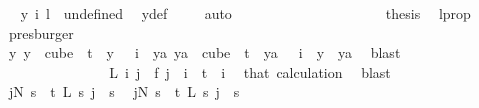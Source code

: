 \begin{isabellebody}
\ \isamarkupfalse%
\ {\isachardoublequoteopen}y\ i\ l\ {\isacharequal}{\kern0pt}\ undefined{\isachardoublequoteclose}\ \isamarkupfalse%
\ y{\isacharunderscore}{\kern0pt}def\ \isamarkupfalse%
\ {}\ \isamarkupfalse%
\ auto\isanewline
\ \ \ \ \ \ \ \ \ \ \ \ \ \ \ \ \ \ \isamarkupfalse%
\ \isamarkupfalse%
\ {\isacharquery}{\kern0pt}thesis\ \isamarkupfalse%
\ l{\isacharunderscore}{\kern0pt}prop\ \isamarkupfalse%
\ presburger\isanewline
\ \ \ \ \ \ \ \ \ \ \ \ \ \ \ \ \isamarkupfalse%
\isanewline
\ \ \ \ \ \ \ \ \ \ \ \ \ \ \isamarkupfalse%
\isanewline
\ \ \ \ \ \ \ \ \ \ \ \ \ \ \isamarkupfalse%
\ \isamarkupfalse%
\ {\isachardoublequoteopen}{\isasymexists}y{\isachardot}{\kern0pt}\ {\isacharparenleft}{\kern0pt}y\ {\isasymin}\ cube\ {}\ t\ {\isasymand}\ y\ {}\ {\isacharequal}{\kern0pt}\ i{\isacharparenright}{\kern0pt}\ {\isasymand}\ {\isacharparenleft}{\kern0pt}{\isasymforall}ya{\isachardot}{\kern0pt}\ ya\ {\isasymin}\ cube\ {}\ t\ {\isasymand}\ ya\ {}\ {\isacharequal}{\kern0pt}\ i\ {\isasymlongrightarrow}\ y\ {\isacharequal}{\kern0pt}\ ya{\isacharparenright}{\kern0pt}{\isachardoublequoteclose}\ \isamarkupfalse%
\ blast\isanewline
\ \ \ \ \ \ \ \ \ \ \ \ \isamarkupfalse%
\isanewline
\isanewline
\ \ \ \ \ \ \ \ \ \ \ \ \isamarkupfalse%
\ \isamarkupfalse%
\ {\isachardoublequoteopen}L\ i\ j\ {\isacharequal}{\kern0pt}\ f\ j{\isachardoublequoteclose}\ \ {\isachardoublequoteopen}i\ {\isacharless}{\kern0pt}\ t{\isachardoublequoteclose}\ \ i\ \isamarkupfalse%
\ that\ calculation\ \isamarkupfalse%
\ blast\isanewline
\ \ \ \ \ \ \ \ \ \ \ \ \isamarkupfalse%
\ \isamarkupfalse%
\ {\isachardoublequoteopen}{\isacharparenleft}{\kern0pt}{\isasymexists}j{\isacharless}{\kern0pt}N{\isacharprime}{\kern0pt}{\isachardot}{\kern0pt}\ {\isacharparenleft}{\kern0pt}{\isasymforall}s\ {\isacharless}{\kern0pt}\ t{\isachardot}{\kern0pt}\ L\ s\ j\ {\isacharequal}{\kern0pt}\ s{\isacharparenright}{\kern0pt}{\isacharparenright}{\kern0pt}{\isachardoublequoteclose}\ \isamarkupfalse%
\ {\isacartoucheopen}{\isacharparenleft}{\kern0pt}{\isasymexists}j{\isacharless}{\kern0pt}N{\isacharprime}{\kern0pt}{\isachardot}{\kern0pt}\ {\isacharparenleft}{\kern0pt}{\isasymforall}s\ {\isacharless}{\kern0pt}\ t{\isachardot}{\kern0pt}\ L{\isacharprime}{\kern0pt}\ s\ j\ {\isacharequal}{\kern0pt}\ s{\isacharparenright}{\kern0pt}{\isacharparenright}{\kern0pt}{\isacartoucheclose}\ \isamarkupfalse%

\end{isabellebody}
